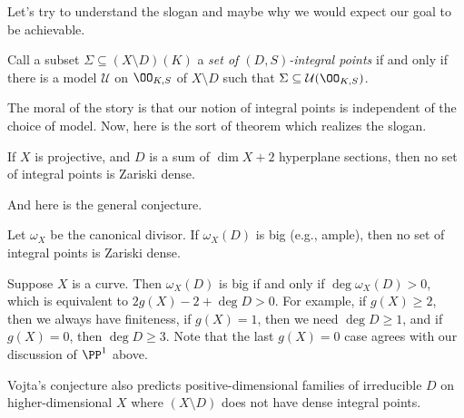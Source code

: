 \documentclass{article}
\begin{document}
Let's try to understand the slogan and maybe why we would expect our goal to be achievable.
\begin{definition}
	Call a subset $\Sigma\subseteq(X\setminus D)(K)$ a \textit{set of $(D,S)$-integral points} if and only if there is a model $\mathcal U$ on $\OO_{K,S}$ of $X\setminus D$ such that $\Sigma\subseteq\mathcal U(\OO_{K,S})$.
\end{definition}
The moral of the story is that our notion of integral points is independent of the choice of model. Now, here is the sort of theorem which realizes the slogan.
\begin{theorem}[Vojta]
	If $X$ is projective, and $D$ is a sum of $\dim X+2$ hyperplane sections, then no set of integral points is Zariski dense.
\end{theorem}
And here is the general conjecture.
\begin{conj}[Vojta]
	Let $\omega_X$ be the canonical divisor. If $\omega_X(D)$ is big (e.g., ample), then no set of integral points is Zariski dense.
\end{conj}
\begin{example}
	Suppose $X$ is a curve. Then $\omega_X(D)$ is big if and only if $\deg\omega_X(D)>0$, which is equivalent to $2g(X)-2+\deg D>0$. For example, if $g(X)\ge2$, then we always have finiteness, if $g(X)=1$, then we need $\deg D\ge1$, and if $g(X)=0$, then $\deg D\ge3$. Note that the last $g(X)=0$ case agrees with our discussion of $\PP^1$ above.
\end{example}
\begin{remark}
	Vojta's conjecture also predicts positive-dimensional families of irreducible $D$ on higher-dimensional $X$ where $(X\setminus D)$ does not have dense integral points.
\end{remark}
\end{document}
